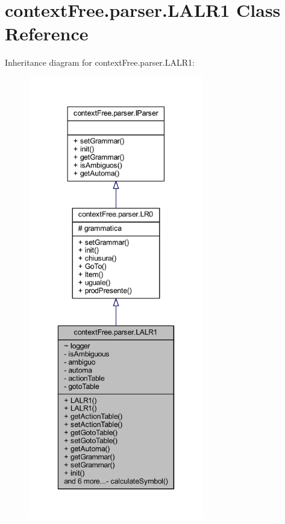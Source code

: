 \hypertarget{classcontext_free_1_1parser_1_1_l_a_l_r1}{\section{context\-Free.\-parser.\-L\-A\-L\-R1 Class Reference}
\label{classcontext_free_1_1parser_1_1_l_a_l_r1}
}


Inheritance diagram for context\-Free.\-parser.\-L\-A\-L\-R1\-:
\nopagebreak
\begin{figure}[H]
\begin{center}
\leavevmode
\includegraphics[height=550pt]{classcontext_free_1_1parser_1_1_l_a_l_r1__inherit__graph}
\end{center}
\end{figure}


